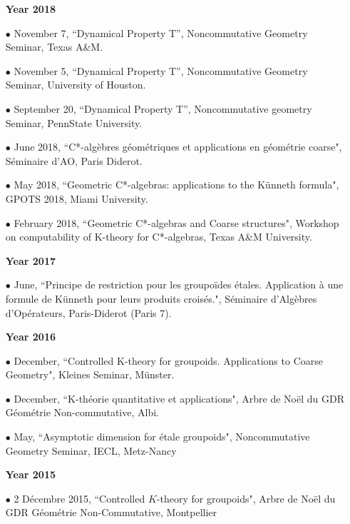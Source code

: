 \documentclass[a4paper,11pt]{article}
\newcommand\espace{\vrule height 20pt width 0pt}
\begin{document}
\begin{itemize}
\item[\textbf{Year 2018}]
\item[$\bullet$] November 7, ``Dynamical Property T'', Noncommutative Geometry Seminar, Texas A\&M.
\item[$\bullet$] November 5, ``Dynamical Property T'', Noncommutative Geometry Seminar, University of Houston.
\item[$\bullet$] September 20, ``Dynamical Property T'', Noncommutative geometry Seminar, PennState University.
\item[$\bullet$] June 2018, ``C*-alg\`ebres g\'eom\'etriques et applications en g\'eom\'etrie coarse", S\'eminaire d'AO, Paris Diderot.
\item[$\bullet$] May 2018, ``Geometric C*-algebras: applications to the K\"unneth formula", GPOTS 2018, Miami University.
\item[$\bullet$] February 2018, ``Geometric C*-algebras and Coarse structures", Workshop on computability of K-theory for C*-algebras, Texas A\&M University.
\end{itemize}

\begin{itemize}
\item[\textbf{Year 2017}]
\item[$\bullet$] June, ``Principe de restriction pour les groupoïdes étales. Application à une formule de Künneth pour leurs produits croisés.", Séminaire d'Algèbres d'Opérateurs, Paris-Diderot (Paris 7).
\end{itemize}
\newpage
\begin{itemize}
\item[\textbf{Year 2016}]
\item[$\bullet$] December, ``Controlled K-theory for groupoids. Applications to Coarse Geometry", Kleines Seminar, Münster.
\item[$\bullet$] December, ``K-théorie quantitative et applications", Arbre de Noël du GDR Géométrie Non-commutative, Albi.
\item[$\bullet$] May, ``Asymptotic dimension for étale groupoids", Noncommutative Geometry Seminar, IECL, Metz-Nancy
\end{itemize}

\begin{itemize}
\item[\textbf{Year 2015}]
\item[$\bullet$] 2 D\'ecembre 2015, ``Controlled $K$-theory for groupoids", Arbre de Noël du GDR Géométrie Non-Commutative, Montpellier
\end{itemize}
\espace
\end{document}
